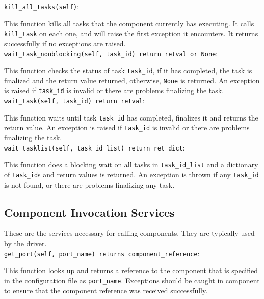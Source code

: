 \texttt{kill\_all\_tasks(self)}:
\par
  This function kills all tasks that the component currently has 
  executing.  It calls \texttt{kill\_task} on each one, and will raise the first 
  exception it encounters.  It returns successfully if no exceptions are 
  raised.\\

\texttt{wait\_task\_nonblocking(self, task\_id) return retval or None}:
\par
  This function checks the status of task \texttt{task\_id}, if it has completed,
  the task is finalized and the return value returned, otherwise, \texttt{None} 
  is returned.  An exception is raised if \texttt{task\_id} is invalid or there 
  are problems finalizing the task.\\

\texttt{wait\_task(self, task\_id) return retval}:
\par
  This function waits until task \texttt{task\_id} has completed, finalizes it and
  returns the return value.  An exception is raised if \texttt{task\_id} is 
  invalid or there are problems finalizing the task.\\

\texttt{wait\_tasklist(self, task\_id\_list) return ret\_dict}:
\par
  This function does a blocking wait on all tasks in \texttt{task\_id\_list} and a
  dictionary of \texttt{task\_id}s and return values is returned.  An exception is 
  thrown if any \texttt{task\_id} is not found, or there are problems finalizing 
  any task.\\


\subsection{Component Invocation Services}
\label{sec:invoc_services}

\par
These are the services necessary for calling components.  They are 
typically used by the driver.\\


\texttt{get\_port(self, port\_name) returns component\_reference}:
\par
  This function looks up and returns a reference to the component
  that is specified in the configuration file as \texttt{port\_name}.  Exceptions 
  should be caught in component to ensure that the component reference was 
  received successfully.\\

